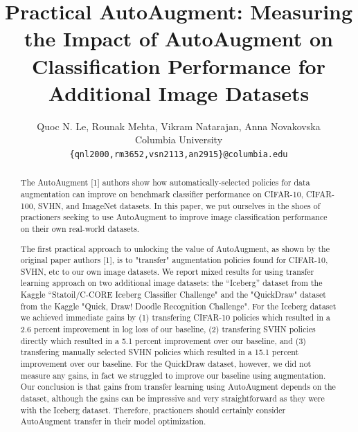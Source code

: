 \documentclass[10pt,twocolumn,letterpaper]{article}
\begin{document}
\title{Practical AutoAugment: Measuring the Impact of AutoAugment on Classification Performance for Additional Image Datasets}

\author{Quoc N. Le, Rounak Mehta, Vikram Natarajan, Anna Novakovska\\
Columbia University\\
{\tt\small \{qnl2000,rm3652,vsn2113,an2915\}@columbia.edu}
\\
}

\maketitle

\begin{abstract}
The AutoAugment [1] authors show how automatically-selected policies for data augmentation can improve on benchmark classifier performance on CIFAR-10, CIFAR-100, SVHN, and ImageNet datasets.  In this paper, we put ourselves in the shoes of practioners seeking to use AutoAugment to improve image classification performance on their own real-world datasets.

The first practical approach to unlocking the value of AutoAugment, as shown by the original paper authors [1], is to "transfer" augmentation policies found for CIFAR-10, SVHN, etc to our own image datasets.  We report mixed results for using transfer learning approach on two additional image datasets: the “Iceberg” dataset from the Kaggle “Statoil/C-CORE Iceberg Classifier Challenge" and the "QuickDraw" dataset from the Kaggle "Quick, Draw! Doodle Recognition Challenge".  For the Iceberg dataset we achieved immediate gains by (1) transfering CIFAR-10 policies which resulted in a 2.6 percent improvement in log loss of our baseline, (2) transfering SVHN policies directly which resulted in a 5.1 percent improvement over our baseline, and (3) transfering manually selected SVHN policies which resulted in a 15.1 percent improvement over our baseline.  For the QuickDraw dataset, however, we did not measure any gains, in fact we struggled to improve our baseline using augmentation.  Our conclusion is that gains from transfer learning using AutoAugment depends on the dataset, although the gains can be impressive and very straightforward as they were with the Iceberg dataset.  Therefore, practioners should certainly consider AutoAugment transfer in their model optimization.


\end{abstract}
\end{document}
